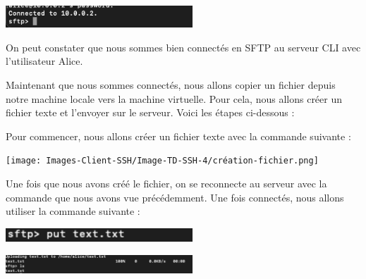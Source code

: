 \documentclass[12pt]{article}
\begin{document}
\begin{center}
  \includegraphics[width=7cm]{Images-Client-SSH/Image-TD-SSH-4/connexion-sftp.png}
\end{center}

\vspace{0.3cm}

On peut constater que nous sommes bien connectés en SFTP au serveur CLI avec l'utilisateur Alice.

\vspace{0.3cm}

Maintenant que nous sommes connectés, nous allons copier un fichier depuis notre machine locale vers la machine virtuelle. Pour cela, nous allons créer un fichier texte et l'envoyer sur le serveur. Voici les étapes ci-dessous :

\vspace{0.3cm}

Pour commencer, nous allons créer un fichier texte avec la commande suivante :

\vspace{0.3cm}

\begin{center}
  \texttt{[image: Images-Client-SSH/Image-TD-SSH-4/création-fichier.png]}
\end{center}

\vspace{0.3cm}

\newpage

\vspace{0.3cm}

Une fois que nous avons créé le fichier, on se reconnecte au serveur avec la commande que nous avons vue précédemment. Une fois connectés, nous allons utiliser la commande suivante :

\vspace{0.3cm}

\begin{center}
  \includegraphics[width=7cm]{Images-Client-SSH/Image-TD-SSH-4/fichier-envoyer.png}
\end{center}

\vspace{0.3cm}

\begin{center}
  \includegraphics[width=7cm]{Images-Client-SSH/Image-TD-SSH-4/commande-reussite.png}
\end{center}
\end{document}
